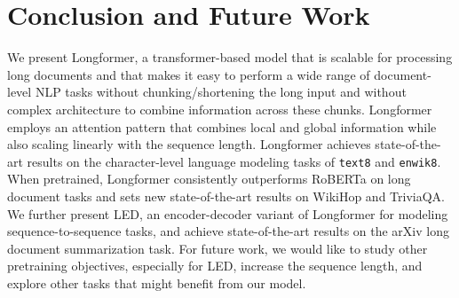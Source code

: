 \section{Conclusion and Future Work} We present Longformer, a transformer-based model that is scalable for processing long documents and that makes it easy to perform a wide range of document-level NLP tasks without chunking/shortening the long input and without complex architecture to combine information across these chunks. Longformer employs an attention pattern that combines local and global information while also scaling linearly with the sequence length. Longformer achieves state-of-the-art results on the character-level language modeling tasks of \texttt{text8} and \texttt{enwik8}. 
When pretrained, Longformer consistently outperforms RoBERTa on long document tasks and sets new state-of-the-art results on WikiHop and TriviaQA. We further present LED, an encoder-decoder variant of Longformer for modeling sequence-to-sequence tasks, and achieve state-of-the-art results on the arXiv long document summarization task. For future work, we would like to study other pretraining objectives, especially for LED, increase the sequence length, and explore other tasks that might benefit from our model. 



